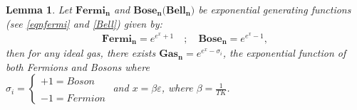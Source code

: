 \documentclass[pdflatex,sn-mathphys-num]{sn-jnl}%
\newtheorem{lemma}{Lemma}
\theoremstyle{thmstyleone}%
\theoremstyle{thmstyletwo}%
\theoremstyle{thmstylethree}%
\begin{document}
\begin{lemma}\label{Gas}
    Let $\mathbf{Fermi_n}$ and $\mathbf{Bose_n}(\mathbf{Bell_n)}$ be exponential generating functions (see \ref{eqnfermi} and \ref{Bell}) given by:
    \begin{align*}
        \mathbf{Fermi_n} = e^{e^x + 1} \quad; \quad
        \mathbf{Bose_n}  = e^{e^x - 1},
    \end{align*}
    then for any ideal gas, there exists $\mathbf{Gas_n} =e^{e^x - \sigma_i}$, the exponential function of both Fermions and Bosons where \\
$\sigma_i  = \begin{cases}
+1 = Boson \\\\
-1 = Fermion
\end{cases}$  and  $x = \beta\varepsilon$, where $\beta = \frac{1}{TK}$.
\end{lemma}
\end{document}
